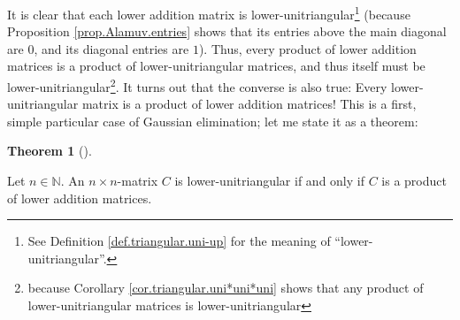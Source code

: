 \documentclass[numbers=enddot,12pt,final,onecolumn,notitlepage]{scrartcl}%
\theoremstyle{definition}
\newtheorem{theo}{Theorem}[section]
\newenvironment{theorem}[1][]
{\begin{theo}[#1]\begin{leftbar}}
{\end{leftbar}\end{theo}}
\begin{document}
It is clear that each lower addition matrix is
lower-unitriangular\footnote{See Definition \ref{def.triangular.uni-up} for
the meaning of \textquotedblleft lower-unitriangular\textquotedblright.}
(because Proposition \ref{prop.Alamuv.entries} shows that its entries above
the main diagonal are $0$, and its diagonal entries are $1$). Thus, every
product of lower addition matrices is a product of lower-unitriangular
matrices, and thus itself must be lower-unitriangular\footnote{because
Corollary \ref{cor.triangular.uni*uni*uni} shows that any product of
lower-unitriangular matrices is lower-unitriangular}. It turns out that the
converse is also true: Every lower-unitriangular matrix is a product of lower
addition matrices! This is a first, simple particular case of Gaussian
elimination; let me state it as a theorem:

\begin{theorem}
\label{thm.triangular.Alamuv}Let $n\in\mathbb{N}$. An $n\times n$-matrix $C$
is lower-unitriangular if and only if $C$ is a product of lower addition matrices.
\end{theorem}
\end{document}
